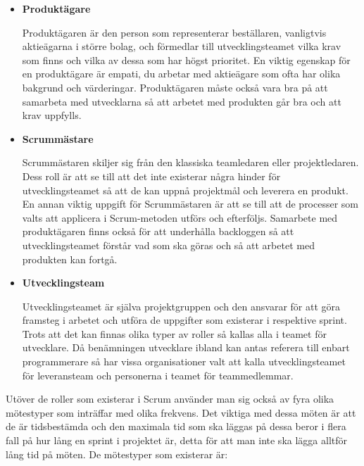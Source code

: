 \begin{itemize}
	\item \textbf{Produktägare}
	
	Produktägaren är den person som representerar beställaren, vanligtvis aktieägarna i större bolag, och förmedlar till utvecklingsteamet vilka krav som finns och vilka av dessa som har högst prioritet. En viktig egenskap för en produktägare är empati, du arbetar med aktieägare som ofta har olika bakgrund och värderingar. Produktägaren måste också vara bra på att samarbeta med utvecklarna så att arbetet med produkten går bra och att krav uppfylls.
	
	\item \textbf{Scrummästare}
	
	Scrummästaren skiljer sig från den klassiska teamledaren eller projektledaren. Dess roll är att se till att det inte existerar några hinder för utvecklingsteamet så att de kan uppnå projektmål och leverera en produkt. En annan viktig uppgift för Scrummästaren är att se till att de processer som valts att applicera i Scrum-metoden utförs och efterföljs. Samarbete med produktägaren finns också för att underhålla backloggen så att utvecklingsteamet förstår vad som ska göras och så att arbetet med produkten kan fortgå.
	
	\item \textbf{Utvecklingsteam}
	
	Utvecklingsteamet är själva projektgruppen och den ansvarar för att göra framsteg i arbetet och utföra de uppgifter som existerar i respektive sprint. Trots att det kan finnas olika typer av roller så kallas alla i teamet för utvecklare. Då benämningen utvecklare ibland kan antas referera till enbart programmerare så har vissa organisationer valt att kalla utvecklingsteamet för leveransteam och personerna i teamet för teammedlemmar.	
\end{itemize}

Utöver de roller som existerar i Scrum använder man sig också av fyra olika mötestyper som inträffar med olika frekvens. Det viktiga med dessa möten är att de är tidsbestämda och den maximala tid som ska läggas på dessa beror i flera fall på hur lång en sprint i projektet är, detta för att man inte ska lägga alltför lång tid på möten. De mötestyper som existerar är:

